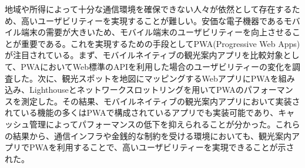 地域や所得によって十分な通信環境を確保できない人々が依然として存在するため、高いユーザビリティーを実現することが難しい。安価な電子機器であるモバイル端末の需要が大きいため、モバイル端末のユーザビリティーを向上させることが重要である。これを実現するための手段としてPWA(Progressive Web Apps)が注目されている。まず、モバイルネイティブの観光案内アプリを比較対象として、PWAにおいてWeb標準のAPIを利用した場合のユーザビリティーの変化を調査した。次に、観光スポットを地図にマッピングするWebアプリにPWAを組み込み、Lighthouseとネットワークスロットリングを用いてPWAのパフォーマンスを測定した。その結果、モバイルネイティブの観光案内アプリにおいて実装されている機能の多くはPWAで構成されているアプリでも実装可能であり、キャッシュ管理によってパフォーマンスの低下を抑えられることが分かった。これらの結果から、通信インフラや金銭的な制約を受ける環境においても、観光案内アプリでPWAを利用することで、高いユーザビリティーを実現できることが示された。